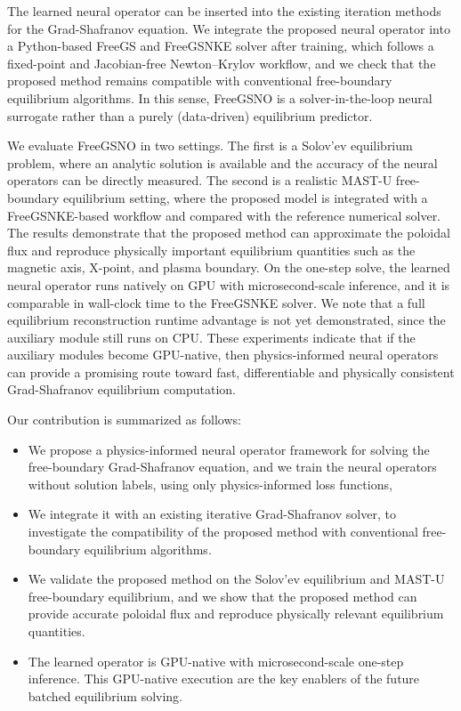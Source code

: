 The learned neural operator can be inserted into the existing iteration methods 
for the Grad-Shafranov equation. 
We integrate the proposed neural operator into a Python-based
FreeGS and FreeGSNKE solver after training, 
which follows a fixed-point and Jacobian-free Newton--Krylov workflow,
and we check that the proposed method remains compatible with conventional free-boundary
equilibrium algorithms. 
In this sense, FreeGSNO is a solver-in-the-loop neural surrogate 
rather than a purely (data-driven) equilibrium predictor.

We evaluate FreeGSNO in two settings. The first is a Solov'ev equilibrium problem, 
where an analytic solution is available and the accuracy of the neural operators 
can be directly measured. 
The second is a realistic MAST-U free-boundary equilibrium setting, 
where the proposed model is integrated with a FreeGSNKE-based workflow and 
compared with the reference numerical solver. 
The results demonstrate that the proposed method can approximate the poloidal flux and 
reproduce physically important equilibrium quantities such as the magnetic axis, 
X-point, and plasma boundary. 
On the one-step solve, the learned neural operator runs natively on GPU with
microsecond-scale inference, and it is comparable in wall-clock time to the FreeGSNKE solver.
We note that a full equilibrium reconstruction runtime advantage is not yet demonstrated,  
since the auxiliary module still runs on CPU.
These experiments indicate that if the auxiliary modules become GPU-native, then
physics-informed neural operators can provide 
a promising route toward fast, differentiable and physically consistent 
Grad-Shafranov equilibrium computation.

Our contribution is summarized as follows:
\begin{itemize}
  \item We propose a physics-informed neural operator framework for solving the
  free-boundary Grad-Shafranov equation, and we train the neural operators 
  without solution labels, using only physics-informed loss functions,
  \item We integrate it with an existing iterative Grad-Shafranov solver,
  to investigate the compatibility of the proposed method
  with conventional free-boundary equilibrium algorithms.
  \item We validate the proposed method on the Solov'ev equilibrium and MAST-U
  free-boundary equilibrium, and we show that the proposed method can provide
  accurate poloidal flux and reproduce physically relevant equilibrium quantities.
  \item The learned operator is GPU-native with
  microsecond-scale one-step inference. This GPU-native execution
  are the key enablers of the future batched equilibrium solving. 
\end{itemize}

